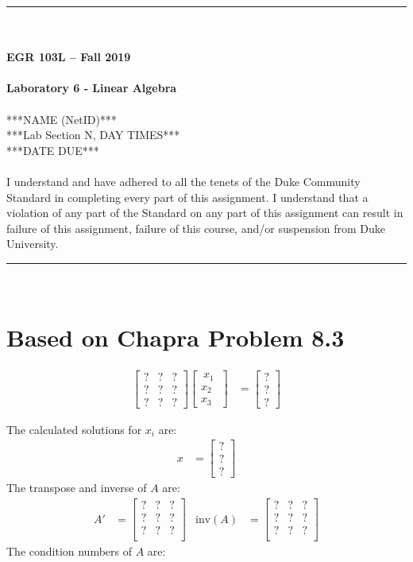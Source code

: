 \documentclass{article}
\begin{document}
\begin{center}
\rule{6.5in}{0.5mm}\\~\\
\textbf{\large EGR 103L -- Fall 2019}\\~\\
\textbf{\huge Laboratory 6 - Linear Algebra}\\~\\
***NAME (NetID)***\\
***Lab Section N, DAY TIMES***\\
***DATE DUE***\\~\\
{\small I understand and have adhered to all the tenets of the Duke
  Community Standard in completing every part of this assignment.  I
  understand that a violation of any part of the Standard on any part
  of this assignment can result in failure of this assignment, failure
  of this course, and/or suspension from Duke University.} 
\rule{6.5in}{0.5mm}\\
\end{center}
\tableofcontents
\listoffigures
\pagebreak
\section{Based on Chapra Problem 8.3}
\begin{align*}
\begin{bmatrix}
 ? & ? & ?\\
 ? & ? & ?\\
 ? & ? & ?
\end{bmatrix}
\begin{bmatrix}
~x_1~ \\ x_2 \\ x_3
\end{bmatrix}&=
\begin{bmatrix}
? \\ ? \\ ? 
\end{bmatrix}
\end{align*}

The calculated solutions for $x_i$ are:
\begin{align*}
x&=\begin{bmatrix}
  ?\\
  ?\\
  ?
\end{bmatrix}
\end{align*}
The transpose and inverse of $A$ are:
\begin{align*}
A' &=
\begin{bmatrix}
 ? & ? & ? \\
 ? & ? & ? \\
 ? & ? & ? \\
\end{bmatrix} &
\mbox{inv}(A) &= 
\begin{bmatrix}
 ? & ? & ? \\
 ? & ? & ? \\
 ? & ? & ? \\
\end{bmatrix}
\end{align*}
The condition numbers of $A$ are:
\end{document}
